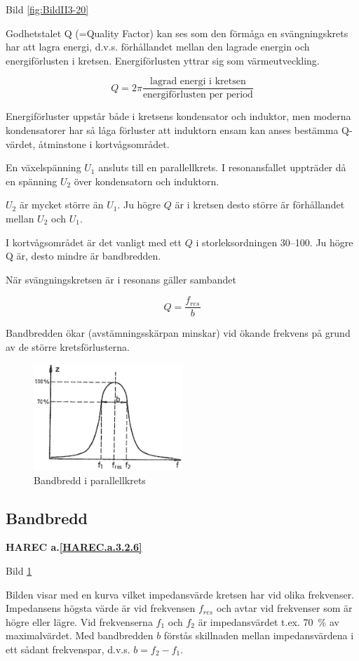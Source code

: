 Bild \ref{fig:BildII3-20}

Godhetstalet Q (=Quality Factor) kan ses som den förmåga en svängningskrets har
att lagra energi, d.v.s. förhållandet mellan den lagrade energin och
energiförlusten i kretsen. Energiförlusten yttrar sig som värmeutveckling.

\[
Q = 2π\frac{\text{lagrad energi i kretsen}}{\text{energiförlusten per period}}
\]

Energiförluster uppstår både i kretsens kondensator och induktor, men moderna
kondensatorer har så låga förluster att induktorn ensam kan anses bestämma
Q-värdet, åtminstone i kortvågsområdet.

En växelspänning \(U_1\) ansluts till en parallellkrets. I resonansfallet
uppträder då en spänning \(U_2\) över kondensatorn och induktorn.

\(U_2\) är mycket större än \(U_1\). Ju högre \(Q\) är i kretsen desto större är
förhållandet mellan \(U_2\) och \(U_1\).

I kortvågsområdet är det vanligt med ett \(Q\) i storleksordningen 30--100.
Ju högre Q är, desto mindre är bandbredden.

När svängningskretsen är i resonans gäller sambandet

\[Q = \frac{f_{res}}{b}\]

Bandbredden ökar (avstämningsskärpan minskar) vid ökande frekvens på grund av de
större kretsförlusterna.

\begin{figure}
\includegraphics[width=0.5\textwidth]{images/cropped_pdfs/bild_2_3-21.pdf}
\caption{Bandbredd i parallellkrets}
\label{fig:BildII3-21}
\end{figure}

\subsection{Bandbredd}
\textbf{HAREC a.\ref{HAREC.a.3.2.6}\label{myHAREC.a.3.2.6}}

Bild \ref{fig:BildII3-21}

Bilden visar med en kurva vilket impedansvärde kretsen har vid olika frekvenser.
Impedansens högsta värde är vid frekvensen \(f_{res}\) och avtar vid frekvenser
som är högre eller lägre. Vid frekvenserna \(f_1\) och \(f_2\) är
impedansvärdet t.ex. 70~\% av maximalvärdet. Med bandbredden \(b\) förstås
skillnaden mellan impedansvärdena i ett sådant frekvenspar, d.v.s.
\(b = f_2 - f_1\).
